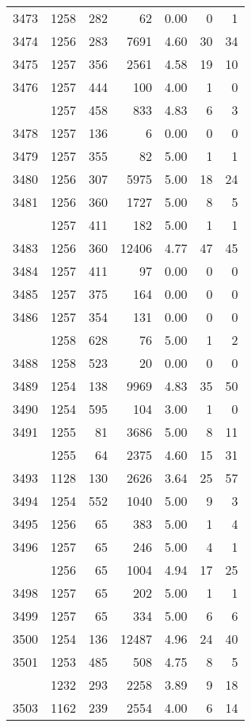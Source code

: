 \documentclass[
]{article}
\begin{document}
\begin{table}
\begin{tabular}[t]{lrrrrrr}
3473 & 1258 & 282 & 62 & 0.00 & 0 & 1\\
3474 & 1256 & 283 & 7691 & 4.60 & 30 & 34\\
3475 & 1257 & 356 & 2561 & 4.58 & 19 & 10\\
3476 & 1257 & 444 & 100 & 4.00 & 1 & 0\\
\addlinespace
3477 & 1257 & 458 & 833 & 4.83 & 6 & 3\\
3478 & 1257 & 136 & 6 & 0.00 & 0 & 0\\
3479 & 1257 & 355 & 82 & 5.00 & 1 & 1\\
3480 & 1256 & 307 & 5975 & 5.00 & 18 & 24\\
3481 & 1256 & 360 & 1727 & 5.00 & 8 & 5\\
\addlinespace
3482 & 1257 & 411 & 182 & 5.00 & 1 & 1\\
3483 & 1256 & 360 & 12406 & 4.77 & 47 & 45\\
3484 & 1257 & 411 & 97 & 0.00 & 0 & 0\\
3485 & 1257 & 375 & 164 & 0.00 & 0 & 0\\
3486 & 1257 & 354 & 131 & 0.00 & 0 & 0\\
\addlinespace
3487 & 1258 & 628 & 76 & 5.00 & 1 & 2\\
3488 & 1258 & 523 & 20 & 0.00 & 0 & 0\\
3489 & 1254 & 138 & 9969 & 4.83 & 35 & 50\\
3490 & 1254 & 595 & 104 & 3.00 & 1 & 0\\
3491 & 1255 & 81 & 3686 & 5.00 & 8 & 11\\
\addlinespace
3492 & 1255 & 64 & 2375 & 4.60 & 15 & 31\\
3493 & 1128 & 130 & 2626 & 3.64 & 25 & 57\\
3494 & 1254 & 552 & 1040 & 5.00 & 9 & 3\\
3495 & 1256 & 65 & 383 & 5.00 & 1 & 4\\
3496 & 1257 & 65 & 246 & 5.00 & 4 & 1\\
\addlinespace
3497 & 1256 & 65 & 1004 & 4.94 & 17 & 25\\
3498 & 1257 & 65 & 202 & 5.00 & 1 & 1\\
3499 & 1257 & 65 & 334 & 5.00 & 6 & 6\\
3500 & 1254 & 136 & 12487 & 4.96 & 24 & 40\\
3501 & 1253 & 485 & 508 & 4.75 & 8 & 5\\
\addlinespace
3502 & 1232 & 293 & 2258 & 3.89 & 9 & 18\\
3503 & 1162 & 239 & 2554 & 4.00 & 6 & 14\\

\end{tabular}
\end{table}
\end{document}

